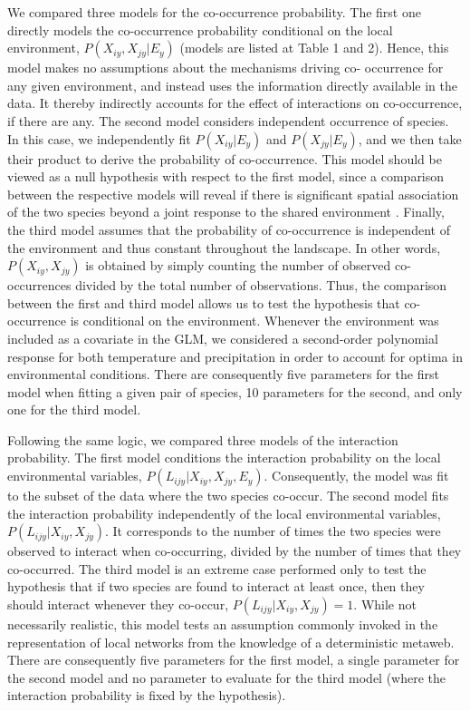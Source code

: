 \documentclass[12pt]{article}
\begin{document}
We compared three models for the co-occurrence probability. The first one
directly models the co-occurrence probability conditional on the local
environment, $P(X_{iy},X_{jy}|E_y)$ (models are listed at Table 1 and 2).
Hence, this model makes no assumptions about the mechanisms driving co-
occurrence for any given environment, and instead uses the information
directly available in the data. It thereby indirectly accounts for the effect
of interactions on co-occurrence, if there are any. The second model considers
independent occurrence of species. In this case, we independently fit
$P(X_{iy} |E_y)$ and $P(X_{jy} |E_y)$, and we then take their product to
derive the probability of co-occurrence. This model should be viewed as a null
hypothesis with respect to the first model, since a comparison between the
respective models will reveal if there is significant spatial association of
the two species beyond a joint response to the shared environment
\citep{Cazelles2016}. Finally, the third model assumes that the probability of
co-occurrence is independent of the environment and thus constant throughout
the landscape. In other words, $P(X_{iy},X_{jy})$ is obtained by simply
counting the number of observed co-occurrences divided by the total number of
observations. Thus, the comparison between the first and third model allows us
to test the hypothesis that co-occurrence is conditional on the environment.
Whenever the environment was included as a covariate in the GLM, we considered
a second-order polynomial response for both temperature and precipitation in
order to account for optima in environmental conditions. There are
consequently five parameters for the first model when fitting a given pair of
species, 10 parameters for the second, and only one for the third model.

Following the same logic, we compared three models of the interaction
probability. The first model conditions the interaction probability on the
local environmental variables, $P(L_{ijy}|X_{iy},X_{jy},E_y)$. Consequently,
the model was fit to the subset of the data where the two species co-occur.
The second model fits the interaction probability independently of the local
environmental variables, $P(L_{ijy}|X_{iy},X_{jy})$. It corresponds to the
number of times the two species were observed to interact when co-occurring,
divided by the number of times that they co-occurred. The third model is an
extreme case performed only to test the hypothesis that if two species are
found to interact at least once, then they should interact whenever they co-occur,
$P(L_{ijy}|X_{iy},X_{jy})=1$. While not necessarily realistic, this
model tests an assumption commonly invoked in the representation of local
networks from the knowledge of a deterministic metaweb. There are consequently
five parameters for the first model, a single parameter for the second model and
no parameter to evaluate for the third model (where the interaction
probability is fixed by the hypothesis).
\end{document}
